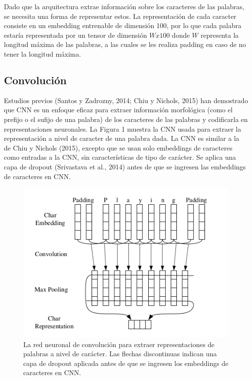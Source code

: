 \documentclass[runningheads]{llncs}
\begin{document}
Dado que la arquitectura extrae información sobre los caracteres de las palabras, se necesita
una forma de representar estos. La representación de cada caracter consiste en un embedding
entrenable de dimensión 100, por lo que cada palabra estaría representada por un tensor de
dimensión $Wx100$ donde $W$ representa la longitud máxima de las palabras, a las cuales se
les realiza padding en caso de no tener la longitud máxima.

\subsection{Convolución}

Estudios previos (Santos y Zadrozny, 2014; Chiu y Nichols, 2015) han demostrado que CNN es un 
enfoque eficaz para extraer información morfológica (como el prefijo o el sufijo de una palabra) 
de los caracteres de las palabras y codificarla en representaciones neuronales. La Figura 1 muestra 
la CNN usada para extraer la representación a nivel de caracter de una palabra dada. La CNN 
es similar a la de Chiu y Nichols (2015), excepto que se usan solo embeddings de caracteres como 
entradas a la CNN, sin características de tipo de carácter. Se aplica una capa de dropout
(Srivastava et al., 2014) antes de que se ingresen las embeddings de caracteres en CNN.

\begin{figure}
	\centering
	\includegraphics[width=12cm]{Fig_1.png}
	\caption{ La red neuronal de convolución para extraer representaciones de palabras a nivel de carácter. Las flechas discontinuas indican una capa de dropout aplicada antes de que se ingresen los embeddings de caracteres en CNN.}
	\label{F1}
\end{figure}
\end{document}

